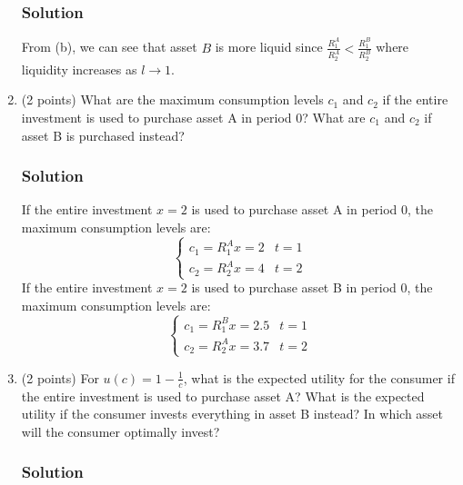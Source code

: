 \documentclass[12pt]{article}
\begin{document}
\begin{enumerate}[label=(\alph*)]
    \subsubsection*{Solution}

    From (b), we can see that asset $B$ is more liquid since $\frac{R_1^A}{R_2^A} < \frac{R_1^B}{R_2^B}$ where liquidity increases as $l\to 1.$

    \item (2 points) What are the maximum consumption levels $c_1$ and $c_2$ if the entire investment is used to purchase asset A in period 0? What are $c_1$ and $c_2$ if asset B is purchased instead?
    \subsubsection*{Solution}

    If the entire investment $x=2$ is used to purchase asset A in period 0, the  maximum consumption levels are:
    \begin{equation}\label{2d_1}
        \begin{cases}
        c_1 = R_{1}^Ax = 2 & t=1
        \\ c_2 = R_{2}^Ax = 4 & t=2
    \end{cases}
    \end{equation}
    If the entire investment $x=2$ is used to purchase asset B in period 0, the  maximum consumption levels are:
    \begin{equation}\label{2d_2}
        \begin{cases}
        c_1 = R_{1}^Bx = 2.5 & t=1
        \\ c_2 = R_{2}^Ax = 3.7 & t=2
    \end{cases}
    \end{equation}


    \item (2 points) For $u(c) = 1 - \frac{1}{c}$, what is the expected utility for the consumer if the entire investment is used to purchase asset A? 
    What is the expected utility if the consumer invests everything in asset B instead? In which asset will the consumer optimally invest?
    \subsubsection*{Solution}


\end{enumerate}
\end{document}
